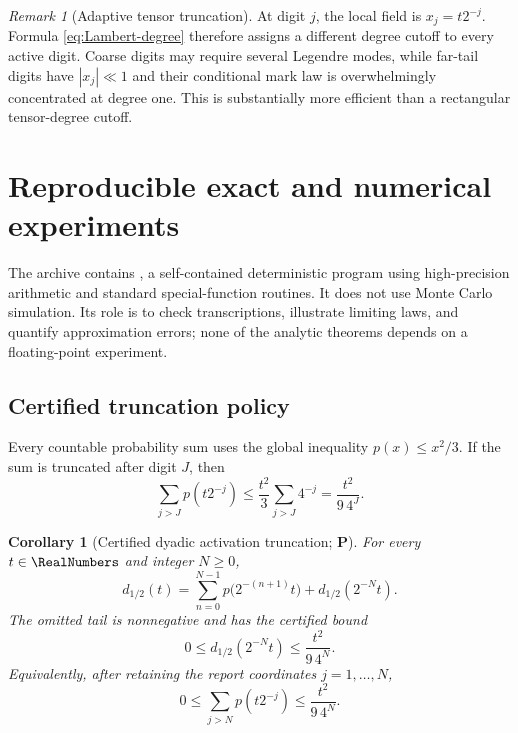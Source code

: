 \documentclass[11pt,oneside]{article}
\newtheorem{corollary}[theorem]{Corollary}
\theoremstyle{definition}
\theoremstyle{remark}
\newtheorem{remark}[theorem]{Remark}
\newcommand{\statusP}{\textcolor{deepgreen}{\textbf{P}}}
\begin{document}
\begin{remark}[Adaptive tensor truncation]
At digit $j$, the local field is $x_j=t2^{-j}$.  Formula
\eqref{eq:Lambert-degree} therefore assigns a different degree cutoff to every
active digit.  Coarse digits may require several Legendre modes, while far-tail
digits have $|x_j|\ll1$ and their conditional mark law is overwhelmingly
concentrated at degree one.  This is substantially more efficient than a
rectangular tensor-degree cutoff.
\end{remark}

\section{Reproducible exact and numerical experiments}
\label{sec:numerics}

The archive contains , a self-contained deterministic
program using high-precision arithmetic and standard special-function
routines.  It does not use Monte Carlo simulation.  Its role is to check
transcriptions, illustrate limiting laws, and quantify approximation errors;
none of the analytic theorems depends on a floating-point experiment.

\subsection{Certified truncation policy}

Every countable probability sum uses the global inequality
$p(x)\le x^2/3$.  If the sum is truncated after digit $J$, then
\begin{equation}
 \sum_{j>J}p(t2^{-j})
 \le\frac{t^2}{3}\sum_{j>J}4^{-j}
 =\frac{t^2}{9\,4^J}.
 \label{eq:numerical-tail-bound}
\end{equation}

\begin{corollary}[Certified dyadic activation truncation; \statusP]
\label{cor:dyadic-activation-truncation}
For every $t\in\RealNumbers$ and integer $N\ge0$,
\begin{equation}
 d_{1/2}(t)
 =\sum_{n=0}^{N-1}p\bigl(2^{-(n+1)}t\bigr)
 +d_{1/2}(2^{-N}t).
 \label{eq:dyadic-activation-prefix}
\end{equation}
The omitted tail is nonnegative and has the certified bound
\begin{equation}
 0\le d_{1/2}(2^{-N}t)
 \le\frac{t^2}{9\,4^N}.
 \label{eq:dyadic-activation-tail}
\end{equation}
Equivalently, after retaining the report coordinates $j=1,\ldots,N$,
\[
 0\le\sum_{j>N}p(t2^{-j})
 \le\frac{t^2}{9\,4^N}.
\]
\end{corollary}
\end{document}

